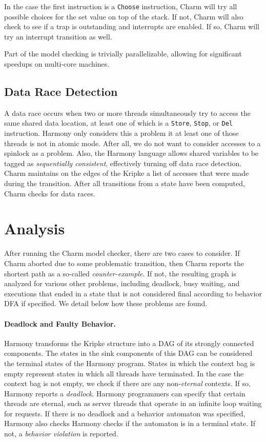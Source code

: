 \documentclass[twocolumn]{article}
\begin{document}
In the case the first instruction is a \texttt{Choose} instruction,
Charm will try all possible choices for the set value
on top of the stack.  If not, Charm will also check to
see if a trap is outstanding and interrupts are enabled.  If so,
Charm will try an interrupt transition as well.

Part of the model checking is trivially parallelizable, allowing for
significant speedups on multi-core machines.

\subsection{Data Race Detection}

A data race occurs when two or more threads simultaneously try to
access the same shared data location, at least one of which is a
\texttt{Store}, \texttt{Stop}, or \texttt{Del} instruction.  Harmony
only considers this a problem it at least one of those threads is
not in atomic mode.  After all, we do not want to consider accesses
to a spinlock as a problem.  Also, the Harmony language allows
shared variables to be tagged as \emph{sequentially consistent},
effectively turning off data race detection.  Charm maintains on
the edges of the Kripke a list of accesses that were made during
the transition.  After all transitions from a state have been
computed, Charm checks for data races.

\section{Analysis}

After running the Charm model checker, there are two cases to
consider.  If Charm aborted due to some problematic transition,
then Charm reports the shortest path as a so-called \emph{counter-example}.
If not, the resulting graph is analyzed for various other problems,
including deadlock, busy waiting, and executions
that ended in a state that is not considered final according to
behavior DFA if specified.  We detail below how these problems are
found.

\paragraph{Deadlock and Faulty Behavior.}

Harmony transforms the Kripke structure into a DAG of its strongly
connected components.  The states in the sink components of this
DAG can be considered the terminal states of the Harmony program.
States in which the context bag is empty represent states in which
all threads have terminated.
In the case the context bag is not empty, we check if there are any
non-\emph{eternal} contexts.  If so, Harmony reports a \emph{deadlock}.
Harmony programmers can specify that certain threads are eternal,
such as server threads that operate in an infinite loop waiting for
requests.
If there is no deadlock and a behavior automaton was specified,
Harmony also checks Harmony checks if the automaton is in a
terminal state.  If not, a \emph{behavior violation} is reported.
\end{document}
